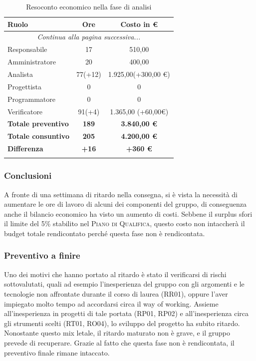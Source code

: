 \documentclass[../piano_di_progetto.tex]{subfiles}
\begin{document}
\begin{center}
	\begin{longtable}{|l|c|c|}
		\hline
		\rowcolor{lightgray}
		\textbf{Ruolo} & \textbf{Ore} & \textbf{Costo in €}\\
		\hline
		\endhead
		
		\hline
		\multicolumn{3}{|c|}{\emph{Continua alla pagina successiva...}}\\
		\hline
		\endfoot

		\endlastfoot
		Responsabile & 17 & 510,00 \\
		Amministratore & 20 & 400,00 \\
		Analista & 77(+12) & 1.925,00(+300,00 €) \\
		Progettista &    0       & 0 \\
		Programmatore &  0       & 0 \\
		Verificatore &   91(+4)      & 1.365,00 (+60,00€) \\
		\hline
		\textbf{Totale preventivo} & \textbf{189} & \textbf{3.840,00 €} \\
		\hline
		\textbf{Totale consuntivo} & \textbf{205	} & \textbf{4.200,00 €} \\
		\hline
		\textbf{Differenza} & \textbf{+16} & \textbf{+360 €}\\
		\hline
		\rowcolor{white}
		\caption{Resoconto economico nella fase di analisi}
	\end{longtable}
\end{center}

\subsubsection{Conclusioni}%
\label{sub:cons_con_1}
A fronte di una settimana di ritardo nella consegna, si è vista la necessità di aumentare le ore di lavoro di alcuni dei componenti del gruppo, di conseguenza anche il bilancio economico ha visto un aumento di costi. Sebbene il surplus sfori il limite del 5\% stabilito nel \textsc{Piano di Qualifica}, questo costo non intaccherà il budget totale rendicontato perché questa fase non è rendicontata.

\subsubsection{Preventivo a finire}
\label{sub:cons_prev_fine_1}
Uno dei motivi che hanno portato al ritardo è stato il verificarsi di rischi sottovalutati, quali ad esempio l'inesperienza del gruppo con gli argomenti e le tecnologie non affrontate durante il corso di laurea (RR01), oppure l'aver impiegato molto tempo ad accordarsi circa il way of working. Assieme all'inesperienza in progetti di tale portata (RP01, RP02) e all'inesperienza circa gli strumenti scelti (RT01, RO04), lo sviluppo del progetto ha subito ritardo. Nonostante questo mix letale, il ritardo maturato non è grave, e il gruppo prevede di recuperare.
Grazie al fatto che questa fase non è rendicontata, il preventivo finale rimane intaccato. \\
\end{document}
